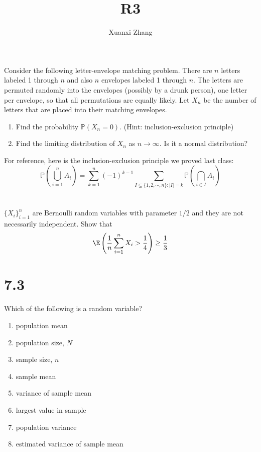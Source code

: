 \documentclass{article}%
\title{\huge R3\\
\normalsize}
\author{Xuanxi Zhang}
\begin{document}
\maketitle
\section{}
Consider the following letter-envelope matching problem. There are $n$ letters labeled 1 through $n$ and also $n$ envelopes labeled 1 through $n$. The letters are permuted randomly into the envelopes (possibly by a drunk person), one letter per envelope, so that all permutations are equally likely. Let $X_n$ be the number of letters that are placed into their matching envelopes.
\begin{enumerate}
    \item Find the probability $\mathbb{P}\left(X_n=0\right)$. (Hint: inclusion-exclusion principle)
    \item Find the limiting distribution of $X_n$ as $n \rightarrow \infty$. Is it a normal distribution?

\end{enumerate}
For reference, here is the inclusion-exclusion principle we proved last class:
$$
\mathbb{P}\left(\bigcup_{i=1}^n A_i\right)=\sum_{k=1}^n(-1)^{k-1} \sum_{I \subseteq\{1,2, \cdots, n\}:|I|=k} \mathbb{P}\left(\bigcap_{i \in I} A_i\right)
$$


\section{}
$\{X_i\}_{i=1}^n$ are Bernoulli random variables with parameter $1/2$ and they are not necessarily independent.
Show that
$$
\E\left(\frac{1}{n}\sum_{i=1}^n X_i>\frac{1}{4}\right)\geq \frac{1}{3}
$$


\section{7.3} Which of the following is a random variable?
\begin{enumerate}
    \item population mean
    \item population size, $N$
    \item sample size, $n$
    \item sample mean
    \item variance of sample mean
    \item largest value in sample
    \item population variance
    \item estimated variance of sample mean
\end{enumerate}
\end{document}
